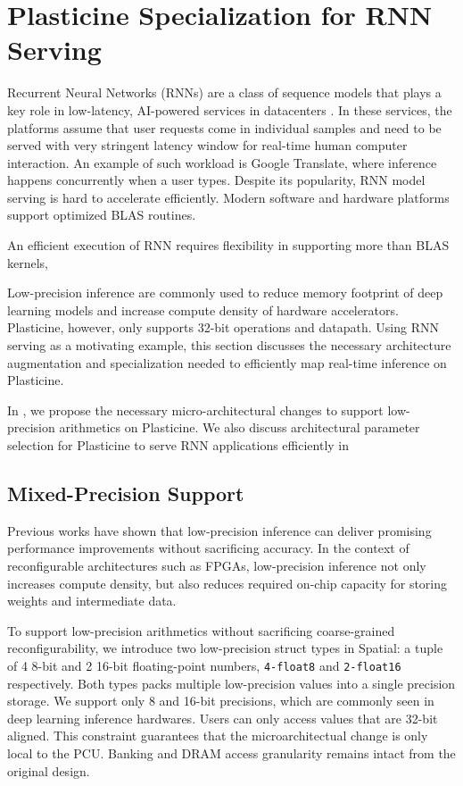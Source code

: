 \section{Plasticine Specialization for RNN Serving} \label{sec:rnn_arch}

Recurrent Neural Networks (RNNs) are a class of sequence models that plays a key role
  in low-latency,
  AI-powered services in datacenters \cite{fowers2018configurable, jouppi2017datacenter}.
In these services,
  the platforms assume that user requests come in individual samples
  and need to be served with very stringent latency window
  for real-time human computer interaction.
  An example of such workload is
  Google Translate, where inference happens concurrently when a user types.
Despite its popularity, RNN model serving is hard to accelerate efficiently.
Modern software and hardware platforms support optimized BLAS routines.

An efficient execution of RNN requires flexibility in supporting more than BLAS kernels, 

Low-precision inference are commonly used to reduce memory footprint of deep learning models and
increase compute density of hardware accelerators.
Plasticine, however, only supports 32-bit operations and datapath.
Using RNN serving as a motivating example, this section discusses the necessary architecture augmentation and
specialization needed to efficiently map real-time inference on Plasticine.

In , we propose the necessary micro-architectural changes to
  support low-precision arithmetics on Plasticine.
We also discuss architectural parameter selection for Plasticine
  to serve RNN applications efficiently in 

\subsection{Mixed-Precision Support} \label{sec:lowprec}
\label{sec:arch:varprec}
Previous works \cite{fowers2018configurable, jouppi2017datacenter}
  have shown that low-precision inference can deliver promising performance
  improvements without sacrificing accuracy.
In the context of reconfigurable architectures such as FPGAs,
  low-precision inference not only increases compute density,
  but also reduces required on-chip capacity for
  storing weights and intermediate data.

To support low-precision arithmetics without sacrificing coarse-grained reconfigurability,
we introduce two low-precision struct types in Spatial: a tuple of 4 8-bit and 2 16-bit floating-point 
numbers, \texttt{4-float8} and \texttt{2-float16} respectively.
Both types packs multiple low-precision values into a single precision storage.
We support only 8 and 16-bit precisions, which are commonly seen in deep learning inference hardwares.
Users can only access values that are 32-bit aligned.
This constraint guarantees that the microarchitectual change is only local to the PCU.
Banking and DRAM access granularity remains intact from the original design.

